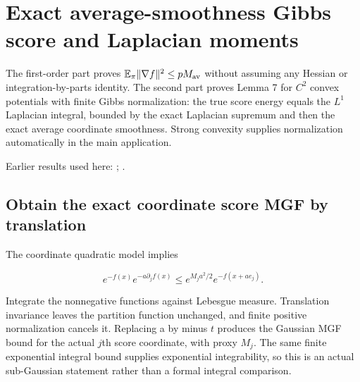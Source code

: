 \documentclass[11pt,a4paper]{report}
\begin{document}
\section{\texorpdfstring{Exact average-smoothness Gibbs score and Laplacian moments}{Exact average-smoothness Gibbs score and Laplacian moments}}
\label{proof-module-AverageLMC-ScoreMoment-lean}


The first-order part proves \(\mathbb E_\pi\|\nabla f\|^2\le pM_{\rm av}\) without assuming any Hessian or integration-by-parts identity. The second part proves Lemma 7 for \(C^{2}\) convex potentials with finite Gibbs normalization: the true score energy equals the \(L^{1}\) Laplacian integral, bounded by the exact Laplacian supremum and then the exact average coordinate smoothness. Strong convexity supplies normalization automatically in the main application.



Earlier results used here: \cite[Section~3.27]{LangevinLean2026ULASC}; \cite[Section~3.46]{LangevinLean2026ULASC}.
\subsection{\texorpdfstring{Obtain the exact coordinate score MGF by translation}{Obtain the exact coordinate score MGF by translation}}
\label{report-step-AverageLMC-ScoreMoment-lean-1}


The coordinate quadratic model implies

\[e^{-f(x)}e^{-a\partial_j f(x)}\le e^{M_j a^2/2}e^{-f(x+ae_j)}.\]

Integrate the nonnegative functions against Lebesgue measure. Translation invariance leaves the partition function unchanged, and finite positive normalization cancels it. Replacing a by minus \(t\) produces the Gaussian MGF bound for the actual \(j\)th score coordinate, with proxy \(M_j\). The same finite exponential integral bound supplies exponential integrability, so this is an actual sub-Gaussian statement rather than a formal integral comparison.
\end{document}
